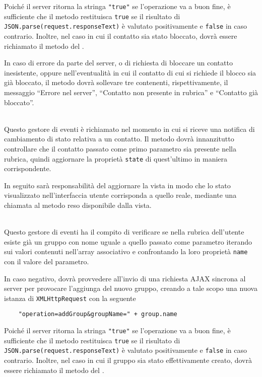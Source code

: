 \begin{description}
Poiché il server ritorna la stringa \verb'"true"' se l'operazione va a buon fine, è sufficiente che il metodo restituisca \verb'true' se il risultato di \verb'JSON.parse(request.responseText)' è valutato positivamente e \verb'false' in caso contrario. Inoltre, nel caso in cui il contatto sia stato bloccato, dovrà essere richiamato il metodo  del .

In caso di errore da parte del server, o di richiesta di bloccare un contatto inesistente, oppure nell'eventualità in cui il contatto di cui si richiede il blocco sia già bloccato, il metodo dovrà sollevare tre  contenenti, rispettivamente, il messaggio ``Errore nel server'', ``Contatto non presente in rubrica'' e ``Contatto già bloccato''.

\item{}\\
Questo gestore di eventi è richiamato nel momento in cui si riceve una notifica di cambiamento di stato relativa a un contatto. Il metodo dovrà innanzitutto controllare che il contatto passato come primo parametro sia presente nella rubrica, quindi aggiornare la proprietà \verb'state' di quest'ultimo in maniera corrispondente.

In seguito sarà responsabilità del  aggiornare la vista in modo che lo stato visualizzato nell'interfaccia utente corrisponda a quello reale, mediante una chiamata al metodo  reso disponibile dalla vista.

\item{}\\
Questo gestore di eventi ha il compito di verificare se nella rubrica dell'utente esiste già un gruppo con nome uguale a quello passato come parametro iterando sui valori contenuti nell'array associativo  e confrontando la loro proprietà \verb'name' con il valore del parametro.

In caso negativo, dovrà provvedere all'invio di una richiesta AJAX sincrona al server per provocare l'aggiunga del nuovo gruppo, creando a tale scopo una nuova istanza di \verb'XMLHttpRequest' con la seguente 
\begin{verbatim}
    "operation=addGroup&groupName=" + group.name
\end{verbatim}

Poiché il server ritorna la stringa \verb'"true"' se l'operazione va a buon fine, è sufficiente che il metodo restituisca \verb'true' se il risultato di \verb'JSON.parse(request.responseText)' è valutato positivamente e \verb'false' in caso contrario. Inoltre, nel caso in cui il gruppo sia stato effettivamente creato, dovrà essere richiamato il metodo  del .


\end{description}
